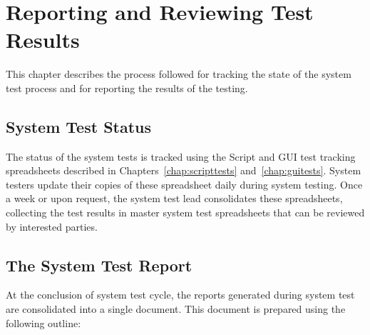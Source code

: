 \chapter{\label{chap:reporting}Reporting and Reviewing Test Results}

This chapter describes the process followed for tracking the state of the system test process and for reporting the results of the testing.

\section{\label{section:TestStatus}System Test Status}

The status of the system tests is tracked using the Script and GUI test tracking spreadsheets described in Chapters~\ref{chap:scripttests} and~\ref{chap:guitests}.  System testers update their copies of these spreadsheet daily during system testing.  Once a week or upon request, the system test lead consolidates these spreadsheets, collecting the test results in master system test spreadsheets that can be reviewed by interested parties.

\section{\label{section:TestReport}The System Test Report}

At the conclusion of system test cycle, the reports generated during system test are consolidated into a single document.  This document is prepared using the following outline:

